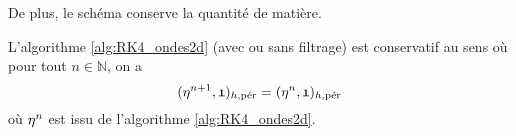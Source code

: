 %
De plus, le schéma conserve la quantité de matière.
\begin{proposition}
L'algorithme \ref{alg:RK4_ondes2d} (avec ou sans filtrage) est conservatif au sens où pour tout $n \in \mathbb{N}$, on a 
\begin{equation}
(\etafrak^{n+1} , \mathfrak{1})_{h,\per} = (\etafrak^{n} , \mathfrak{1})_{h,\per}
\end{equation}
où $\etafrak^n$ est issu de l'algorithme \ref{alg:RK4_ondes2d}.
\end{proposition}

